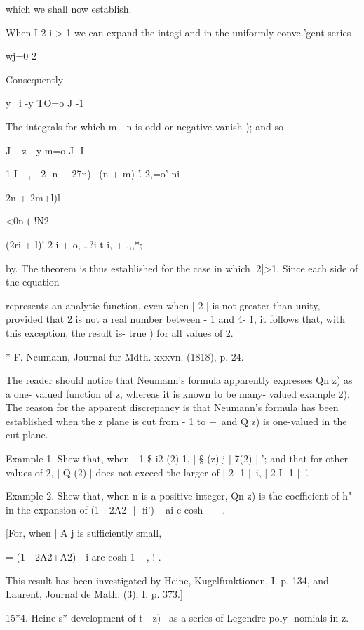 {{which we shall now establish.

When I 2 i > 1 we can expand the integi-and in the uniformly
conve|'gent series

wj=0 2

Consequently

 y \ i -y TO=o J -1

The integrals for which m - n is odd or negative vanish );
and so

  J -\ z - y m=o J -I

 1 I \ .,\, \, 2- n + 27n) \ (n + m) '. 2,=o' ni\ \ {2n + 2m+l)l

<0n ( !N2

(2ri + l)! 2 i + o, .,?i-t-i, + .,,*;

by. The theorem is thus established for the case in which
|2|>1. Since each side of the equation

represents an analytic function, even when | 2 | is not greater than
unity, provided that 2 is not a real number between - 1 and 4- 1, it
follows that, with this exception, the result is- true ) for all
values of 2.

* F. Neumann, Journal fur Mdth. xxxvn. (1818), p. 24.

%
%

The reader should notice that Neumann's formula apparently expresses
Qn z) as a one- valued function of z, whereas it is known to be many-
valued  example 2). The reason for the apparent discrepancy is
that Neumann's formula has been established when the z plane is cut
from - 1 to +\, and Q z) is one-valued in the cut plane.

Example 1. Shew that, when - 1 \$ i2 (2) 1, | § (z) j | 7(2) |-'; and
that for other values of 2, | Q (2) | does not exceed the larger of |
2- 1 |~i, | 2-I- 1 |~'.

Example 2. Shew that, when n is a positive integer, Qn z) is the
coefficient of h" in the expansion of (1 - 2A2 -|- fi') ~ ai-c cosh \
- \ .

[For, when | A j is sufficiently small,

= (1 - 2A2+A2) - i arc cosh 1- --, ! .

This result has been investigated by Heine, Kugelfunktionen, I. p.
134, and Laurent, Journal de Math. (3), I. p. 373.]

15*4. Heine s* development of t - z)~ as a series of Legendre poly-
nomials in z.

}}}
